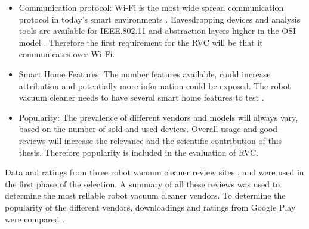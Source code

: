 \begin{itemize}
    \item Communication protocol: Wi-Fi is the most wide spread communication protocol in today's smart environments \cite{robotsel1}. Eavesdropping devices and analysis tools are available for IEEE.802.11 and abstraction layers higher in the OSI model \cite{osimodel}. Therefore the first requirement for the RVC will be that it communicates over Wi-Fi.
    
    \item Smart Home Features:  The number features available, could increase attribution and potentially more information could be exposed. The robot vacuum cleaner needs to have several smart home features to test \cite{robotsel4}.
    
    \item Popularity: The prevalence of different vendors and models will always vary, based on the number of sold and used devices. Overall usage and good reviews will increase the relevance and the scientific contribution of this thesis. Therefore popularity is included in the evaluation of RVC.
\end{itemize}

Data and ratings from three robot vacuum cleaner review sites \cite{robotsel11}, \cite{robotsel12} and \cite{robotsel13} were used in the first phase of the selection. A summary of all these reviews was used to determine the most reliable robot vacuum cleaner vendors. To determine the popularity of the different vendors, downloadings and ratings from Google Play were compared \cite{GooglePlay}.

